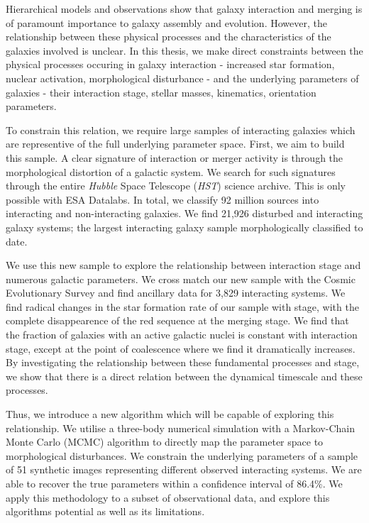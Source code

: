 

\begin{abstracts}        %
Hierarchical models and observations show that galaxy interaction and merging is of paramount importance to galaxy assembly and evolution. However, the relationship between these physical processes and the characteristics of the galaxies involved is unclear. In this thesis, we make direct constraints between the physical processes occuring in galaxy interaction - increased star formation, nuclear activation, morphological disturbance - and the underlying parameters of galaxies - their interaction stage, stellar masses, kinematics, orientation parameters. 

To constrain this relation, we require large samples of interacting galaxies which are representive of the full underlying parameter space. First, we aim to build this sample. A clear signature of interaction or merger activity is through the morphological distortion of a galactic system. We search for such signatures through the entire \textit{Hubble} Space Telescope (\textit{HST}) science archive. This is only possible with ESA Datalabs. In total, we classify 92 million sources into interacting and non-interacting galaxies. We find 21,926 disturbed and interacting galaxy systems; the largest interacting galaxy sample morphologically classified to date. 

We use this new sample to explore the relationship between interaction stage and numerous galactic parameters. We cross match our new sample with the Cosmic Evolutionary Survey and find ancillary data for 3,829 interacting systems. We find radical changes in the star formation rate of our sample with stage, with the complete disappearence of the red sequence at the merging stage. We find that the fraction of galaxies with an active galactic nuclei is constant with interaction stage, except at the point of coalescence where we find it dramatically increases. By investigating the relationship between these fundamental processes and stage, we show that there is a direct relation between the dynamical timescale and these processes.

Thus, we introduce a new algorithm which will be capable of exploring this relationship. We utilise a three-body numerical simulation with a Markov-Chain Monte Carlo (MCMC) algorithm to directly map the parameter space to morphological disturbances. We constrain the underlying parameters of a sample of 51 synthetic images representing different observed interacting systems. We are able to recover the true parameters within a confidence interval of 86.4\%. We apply this methodology to a subset of observational data, and explore this algorithms potential as well as its limitations.

\end{abstracts}



